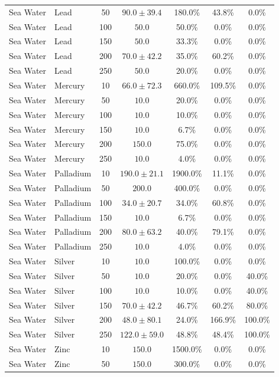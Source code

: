 \begin{table}[!t]
\begin{tabular}{llccccc}
Sea Water & Lead & 50 & $90.0 \pm 39.4$ & 180.0\% & 43.8\% & 0.0\% \\
Sea Water & Lead & 100 & $50.0$ & 50.0\% & 0.0\% & 0.0\% \\
Sea Water & Lead & 150 & $50.0$ & 33.3\% & 0.0\% & 0.0\% \\
Sea Water & Lead & 200 & $70.0 \pm 42.2$ & 35.0\% & 60.2\% & 0.0\% \\
Sea Water & Lead & 250 & $50.0$ & 20.0\% & 0.0\% & 0.0\% \\
Sea Water & Mercury & 10 & $66.0 \pm 72.3$ & 660.0\% & 109.5\% & 0.0\% \\
Sea Water & Mercury & 50 & $10.0$ & 20.0\% & 0.0\% & 0.0\% \\
Sea Water & Mercury & 100 & $10.0$ & 10.0\% & 0.0\% & 0.0\% \\
Sea Water & Mercury & 150 & $10.0$ & 6.7\% & 0.0\% & 0.0\% \\
Sea Water & Mercury & 200 & $150.0$ & 75.0\% & 0.0\% & 0.0\% \\
Sea Water & Mercury & 250 & $10.0$ & 4.0\% & 0.0\% & 0.0\% \\
Sea Water & Palladium & 10 & $190.0 \pm 21.1$ & 1900.0\% & 11.1\% & 0.0\% \\
Sea Water & Palladium & 50 & $200.0$ & 400.0\% & 0.0\% & 0.0\% \\
Sea Water & Palladium & 100 & $34.0 \pm 20.7$ & 34.0\% & 60.8\% & 0.0\% \\
Sea Water & Palladium & 150 & $10.0$ & 6.7\% & 0.0\% & 0.0\% \\
Sea Water & Palladium & 200 & $80.0 \pm 63.2$ & 40.0\% & 79.1\% & 0.0\% \\
Sea Water & Palladium & 250 & $10.0$ & 4.0\% & 0.0\% & 0.0\% \\
Sea Water & Silver & 10 & $10.0$ & 100.0\% & 0.0\% & 0.0\% \\
Sea Water & Silver & 50 & $10.0$ & 20.0\% & 0.0\% & 40.0\% \\
Sea Water & Silver & 100 & $10.0$ & 10.0\% & 0.0\% & 40.0\% \\
Sea Water & Silver & 150 & $70.0 \pm 42.2$ & 46.7\% & 60.2\% & 80.0\% \\
Sea Water & Silver & 200 & $48.0 \pm 80.1$ & 24.0\% & 166.9\% & 100.0\% \\
Sea Water & Silver & 250 & $122.0 \pm 59.0$ & 48.8\% & 48.4\% & 100.0\% \\
Sea Water & Zinc & 10 & $150.0$ & 1500.0\% & 0.0\% & 0.0\% \\
Sea Water & Zinc & 50 & $150.0$ & 300.0\% & 0.0\% & 0.0\% \\

\end{tabular}
\end{table}
